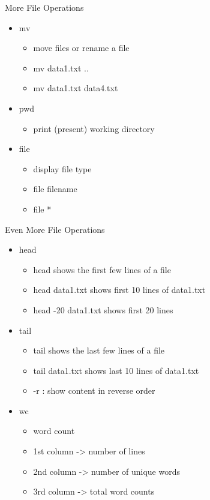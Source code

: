 \documentclass{beamer}
\begin{document}
\begin{frame}{More File Operations}
\begin{itemize}
\item mv
\begin{itemize}
\item move files or rename a file
\item mv data1.txt ..
\item mv data1.txt data4.txt
\end{itemize}
\item pwd
\begin{itemize}
\item print (present) working directory
\end{itemize}
\item file
\begin{itemize}
\item display file type
\item file filename
\item file *
\end{itemize}
\end{itemize}
\end{frame}

\begin{frame}{Even More File Operations}
\begin{itemize}
\item head
\begin{itemize}
\item head shows the first few lines of a file
\item head data1.txt shows first 10 lines of data1.txt
\item head -20 data1.txt shows first 20 lines
\end{itemize}
\item tail
\begin{itemize}
\item tail shows the last few lines of a file
\item tail data1.txt shows last 10 lines of data1.txt
\item -r : show content in reverse order
\end{itemize}
\item wc
\begin{itemize}
\item word count
\item 1st column -> number of lines
\item 2nd column -> number of unique words
\item 3rd column -> total word counts
\end{itemize}
\end{itemize}
\end{frame}
\end{document}
